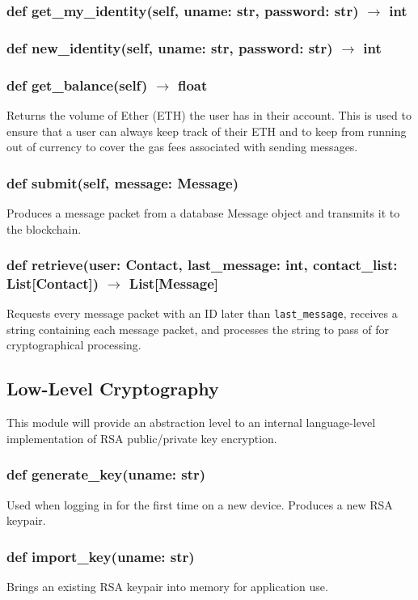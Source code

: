 \documentclass[titlepage]{report}
\begin{document}
\subsubsection{def get\_my\_identity(self, uname: str, password: str) $\rightarrow$ int}
\subsubsection{def new\_identity(self, uname: str, password: str) $\rightarrow$ int}
\subsubsection{def get\_balance(self) $\rightarrow$ float}
Returns the volume of \gls{Ether} (ETH) the user has in their account. This is used to ensure that a user can always keep track of their ETH and to keep from running out of currency to cover the gas fees associated with sending messages.
\subsubsection{def submit(self, message: Message)}
Produces a message packet from a database Message object and transmits it to the \gls{blockchain}.
\subsubsection{def retrieve(user: Contact, last\_message: int, contact\_list: List[Contact]) $\rightarrow$ List[Message]}
Requests every message packet with an ID later than \texttt{last\_message}, receives a string containing each message packet, and processes the string to pass of for cryptographical processing.

\subsection{Low-Level Cryptography}
This module will provide an abstraction level to an internal language-level implementation of RSA public/private key encryption.

\subsubsection{def generate\_key(uname: str)}
Used when logging in for the first time on a new device. Produces a new RSA keypair.
\subsubsection{def import\_key(uname: str)}
Brings an existing RSA keypair into memory for application use.
\end{document}
